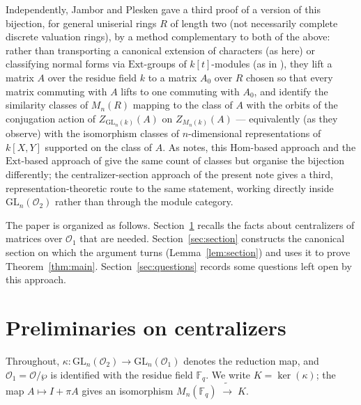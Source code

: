\documentclass[11pt]{amsart}
\theoremstyle{definition}
\newcommand{\GL}{\mathrm{GL}}
\newcommand{\Fq}{\mathbb{F}_q}
\begin{document}
	Independently, Jambor and Plesken \cite{JP2012} gave a third proof of a
	version of this bijection, for general uniserial rings $R$ of length two
	(not necessarily complete discrete valuation rings), by a method
	complementary to both of the above: rather than transporting a canonical
	extension of characters (as here) or classifying normal forms via
	$\mathrm{Ext}$-groups of $k[t]$-modules (as in \cite{PSS2015}), they lift
	a matrix $A$ over the residue field $k$ to a matrix $A_0$ over $R$ chosen
	so that every matrix commuting with $A$ lifts to one commuting with $A_0$,
	and identify the similarity classes of $M_n(R)$ mapping to the class of
	$A$ with the orbits of the conjugation action of $Z_{\GL_n(k)}(A)$ on
	$Z_{M_n(k)}(A)$ — equivalently (as they observe) with the isomorphism
	classes of $n$-dimensional representations of $k[X,Y]$ supported on the
	class of $A$. As \cite[Remark~1.1]{PSS2015} notes, this $\mathrm{Hom}$-based
	approach and the $\mathrm{Ext}$-based approach of \cite{PSS2015} give the
	same count of classes but organise the bijection differently; the
	centralizer-section approach of the present note gives a third,
	representation-theoretic route to the same statement, working directly
	inside $\GL_n(\mathcal O_2)$ rather than through the module category.
	
	The paper is organized as follows. Section~\ref{sec:prelim} recalls the
	facts about centralizers of matrices over $\mathcal O_1$ that are needed.
	Section~\ref{sec:section} constructs the canonical section on which the
	argument turns (Lemma~\ref{lem:section}) and uses it to prove
	Theorem~\ref{thm:main}. Section~\ref{sec:questions} records some questions
	left open by this approach.
	
	\section{Preliminaries on centralizers}\label{sec:prelim}
	
	Throughout, $\kappa:\GL_n(\mathcal O_2)\to\GL_n(\mathcal O_1)$ denotes the
	reduction map, and $\mathcal O_1=\mathcal O/\wp$ is identified with the
	residue field $\Fq$. We write $K=\ker(\kappa)$; the map $A\mapsto I+\pi A$
	gives an isomorphism $M_n(\Fq)\;\widetilde\to\;K$.
	
\end{document}
